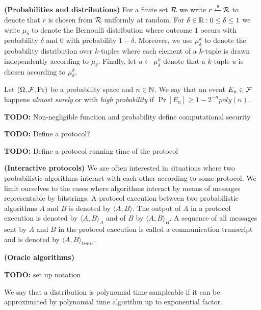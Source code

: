 \textbf{(Probabilities and distributions)}
For a finite set $\mathcal{R}$ we write $r \xleftarrow{\$} \mathcal{R}$ to denote that $r$ is chosen from $\mathcal{R}$ uniformly at random.
For $\delta \in \mathbb{R} : 0 \leq \delta \leq 1$ we write $\mu_{\delta}$ to denote the Bernoulli distribution where outcome $1$ occurs with
probability $\delta$ and $0$ with probability $1-\delta$.
Moreover, we use $\mu_{\delta}^k$ to denote the probability distribution over $k$-tuples
where each element of a $k$-tuple is drawn independently according to $\mu_{\delta}$.
Finally, let $u \leftarrow \mu_{\delta}^k$ denote that a $k$-tuple $u$ is chosen according to $\mu_{\delta}^k$.

Let $(\Omega, \mathcal{F}, \Pr)$ be a probability space and $n \in \mathbb{N}$. We say that an event $E_n \in \mathcal{F}$
happens \textit{almost surely} or with \textit{high probability} if $\Pr[E_n] \geq 1 - 2^{-n} \mathit{poly}(n)$.

\begin{todo}
  \textbf{TODO:} Non-negligible function and probability
define computational security
\end{todo}

\begin{todo}
  \textbf{TODO:} Define a protocol?
\end{todo}

\begin{todo}
  \textbf{TODO:} Define a protocol running time of the protocol
\end{todo}

\textbf{(Interactive protocols)} We are often interested in situations where two probabilistic algorithms interact with each other according to some protocol.
We limit ourselves to the cases where algorithms interact by means of messages representable by bitstrings.
A protocol execution between two probabilistic algorithms $A$ and $B$ is denoted by $\langle A, B \rangle$.
The output of $A$ in a protocol execution is denoted by $\langle A, B \rangle_A$ and of $B$ by $\langle A, B \rangle_B$.
A sequence of all messages sent by $A$ and $B$ in the protocol execution is called a communication transcript and
is denoted by $\langle A, B \rangle_{\mathit{trans}}$.

\textbf{(Oracle algorithms)}
\begin{todo}
  \textbf{TODO:} set up notation
\end{todo}

\begin{definition}
We say that a distribution is polynomial time sampleable if it can be approximated by polynomial time algorithm
up to exponential factor.
\end{definition}

